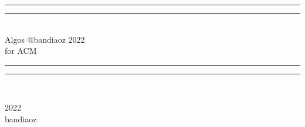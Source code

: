 \documentclass[a4paper,11pt]{ctexbook}
\begin{document}
 
  \begin{titlepage}       %
    \centering
    \vspace*{\baselineskip}
    \rule{\textwidth}{1.6pt}\vspace*{-\baselineskip}\vspace*{2pt}
    \rule{\textwidth}{0.4pt}\\[\baselineskip]
    {\LARGE Algos @bandiaoz 2022\\[\baselineskip]\small for ACM}
    \\[0.2\baselineskip]
    \rule{\textwidth}{0.4pt}\vspace*{-\baselineskip}\vspace{3.2pt}
    \rule{\textwidth}{1.6pt}\\[\baselineskip]
    \scshape

    \begin{figure}[!htb]
        \centering
    \end{figure}

    \vfill
    {\scshape 2022} \\{\large bandiaoz}\par
  \end{titlepage}
 \newpage            %
\tableofcontents     %

\setcounter{page}{1}


\end{document}
